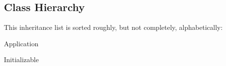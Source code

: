 \subsection{Class Hierarchy}
This inheritance list is sorted roughly, but not completely, alphabetically\+:\begin{DoxyCompactList}
\item {}
\item {}
\item Application\begin{DoxyCompactList}
\item {}
\end{DoxyCompactList}
\item Initializable\begin{DoxyCompactList}
\item {}
\item {}
\item {}
\end{DoxyCompactList}
\end{DoxyCompactList}
